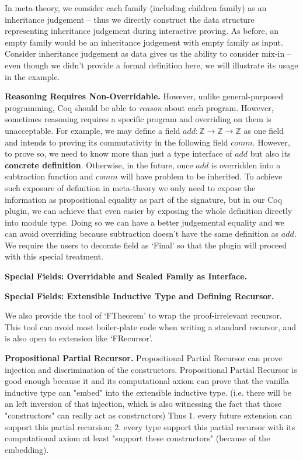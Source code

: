 

In meta-theory, we consider each family (including children family) as an inheritance judgement -- thus we directly construct the data structure representing inheritance judgement during interactive proving. As before, an empty family would be an inheritance judgement with empty family as input. Consider inheritance judgement as data gives us the ability to consider mix-in -- even though we didn't provide a formal definition here, we will illustrate its usage in the example. 



\textbf{Reasoning Requires Non-Overridable.}
However, unlike general-purposed programming, Coq should be able to  \textit{reason} about each program. However, sometimes reasoning requires a specific program and overriding on them is unacceptable. For example, we may define a field $add : \mathbb{Z} \to \mathbb{Z} \to \mathbb{Z}$ as one field and intends to proving its commutativity in the following field $comm$. However, to prove so, we need to know more than just a type interface of $add$ but also its \textbf{concrete definition}. Otherwise, in the future, once $add$ is overridden into a subtraction function and $comm$ will have problem to be  inherited. To achieve such exposure of definition in meta-theory we only need to expose the information as propositional equality as part of the signature, but in our Coq plugin, we can achieve that even easier by exposing the whole definition directly into module type. Doing so we can have a better judgemental equality and we can avoid overriding because subtraction doesn't have the same definition as $add$. We require the users to decorate field as `Final' so that the plugin will proceed with this special treatment.

\textbf{Special Fields: Overridable and Sealed Family as Interface.}



\textbf{Special Fields: Extensible Inductive Type and Defining Recursor.}

We also provide the tool of `FTheorem' to wrap the proof-irrelevant recursor. This tool can avoid most boiler-plate code when writing a standard recursor, and is also open to extension like `FRecursor'.

\textbf{Propositional Partial Recursor.}
Propositional Partial Recursor can prove injection and discrimination of the constructors.
Propositional Partial Recursor is good enough because it and its computational axiom can prove that the vanilla inductive type can "embed" into the extensible inductive type. 
(i.e. there will be an left inversion of that injection, which is also witnessing the fact that those "constructors" can really act as constructors) 
Thus 1. every future extension can support this partial recursion; 2. every type support this partial recursor with its computational axiom at least "support these constructors" (because of the embedding).


